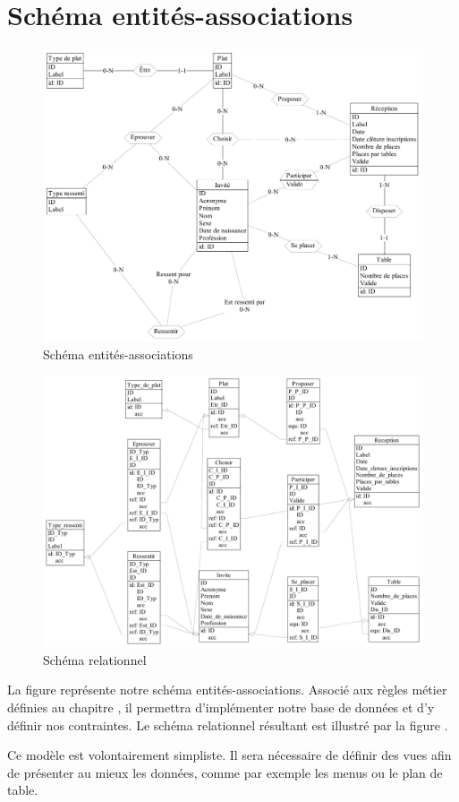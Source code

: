 \chapter{Schéma entités-associations}

\begin{figure}
  \centering
  \includegraphics[angle=90]{IMG/ea}
  \caption{Schéma entités-associations}
  \label{img_ea}
\end{figure}

\begin{figure}
  \centering
  \includegraphics[angle=90]{IMG/rel}
  \caption{Schéma relationnel}
  \label{img_rel}
\end{figure}

La figure  représente notre schéma entités-associations. Associé aux règles métier définies au chapitre , il permettra d'implémenter notre base de données et d'y définir nos contraintes. Le schéma relationnel résultant est illustré par la figure .

Ce modèle est volontairement simpliste. Il sera nécessaire de définir des vues afin de présenter au mieux les données, comme par exemple les menus ou le plan de table.